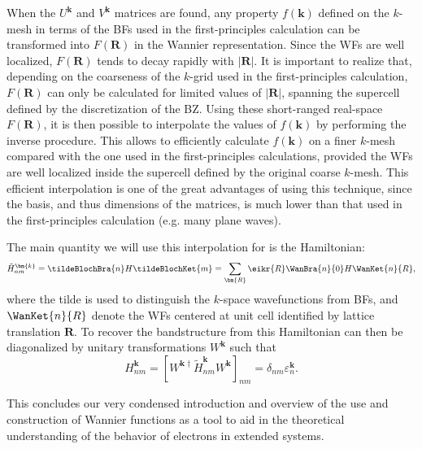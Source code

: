 When the $U^{\bm{k}}$ and $V^{\bm{k}}$ matrices are found, any property $f(\bm{k})$ defined on the $k$-mesh in terms of the BFs used in the first-principles calculation can be transformed into $F(\bm{R})$ in the Wannier representation.
Since the WFs are well localized, $F(\bm{R})$ tends to decay rapidly with $|\bm{R}|$.
It is important to realize that, depending on the coarseness of the $k$-grid used in the first-principles calculation, $F(\bm{R})$ can only be calculated for limited values of $|\bm{R}|$, spanning the supercell defined by the discretization of the BZ.
Using these short-ranged real-space $F(\bm{R})$, it is then possible to interpolate the values of $f(\bm{k})$ by performing the inverse procedure. This allows to efficiently calculate $f(\bm{k})$ on a finer $k$-mesh compared with the one used in the first-principles calculations, provided the WFs are well localized inside the supercell defined by the original coarse $k$-mesh.
This efficient interpolation is one of the great advantages of using this technique, since the basis, and thus dimensions of the matrices, is much lower than that used in the first-principles calculation (e.g. many plane waves).

The main quantity we will use this interpolation for is the Hamiltonian:
\begin{equation}
	\label{eq:Theory_waninterp}
	\tilde{H}_{nm}^{\bm{k}} = \tildeBlochBra{n} H \tildeBlochKet{m} = \sum_{\bm{R}} \eikr{R} \WanBra{n}{0}H\WanKet{n}{R},
\end{equation}
where the tilde is used to distinguish the $k$-space wavefunctions from BFs, and $\WanKet{n}{R}$ denote the WFs centered at unit cell identified by lattice translation $\bm{R}$.
To recover the bandstructure from this Hamiltonian can then be diagonalized by unitary transformations $W^{\bm{k}}$ such that
\begin{equation}
H_{nm}^{\bm{k}} = [W^{\bm{k}\dagger} \tilde{H}_{nm}^{\bm{k}} W^{\bm{k}}]_{nm} = \delta_{nm} \varepsilon_{n}^{\bm{k}}.
\end{equation}

This concludes our very condensed introduction and overview of the use and construction of Wannier functions as a tool to aid in the theoretical understanding of the behavior of electrons in extended systems.

